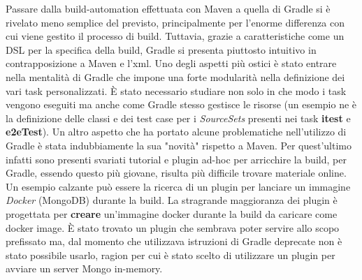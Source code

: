 Passare dalla build-automation effettuata con Maven a quella di Gradle si è rivelato meno semplice del previsto, principalmente per l'enorme differenza con cui viene gestito il processo di build. Tuttavia, grazie a caratteristiche come un DSL per la specifica della build, Gradle si presenta piuttosto intuitivo in contrapposizione a Maven e l'xml.\newline
Uno degli aspetti più ostici è stato entrare nella mentalità di Gradle che impone una forte modularità nella definizione dei vari task personalizzati. È stato necessario studiare non solo in che modo i task vengono eseguiti ma anche come Gradle stesso gestisce le risorse (un esempio ne è la definizione delle classi e dei test case per i \textsl{SourceSets} presenti nei task \textbf{itest} e \textbf{e2eTest}).\newline\newline
Un altro aspetto che ha portato alcune problematiche nell'utilizzo di Gradle è stata indubbiamente la sua "novità" rispetto a Maven. Per quest'ultimo infatti sono presenti svariati tutorial e plugin ad-hoc per arricchire la build, per Gradle, essendo questo più giovane, risulta più difficile trovare materiale online.\newline
Un esempio calzante può essere la ricerca di un plugin per lanciare un immagine \textsl{Docker} (MongoDB) durante la build. La stragrande maggioranza dei plugin è progettata per \textbf{creare} un'immagine docker durante la build da caricare come docker image. È stato trovato un plugin che sembrava poter servire allo scopo prefissato ma, dal momento che utilizzava istruzioni di Gradle deprecate non è stato possibile usarlo, ragion per cui è stato scelto di utilizzare un plugin per avviare un server Mongo in-memory.